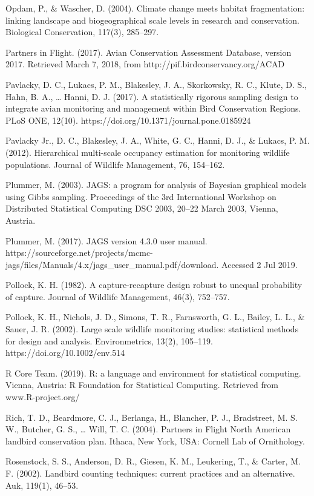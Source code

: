 \documentclass[
  letterpaper,
  DIV=11,
  numbers=noendperiod,
  oneside]{scrreprt}
\begin{document}
Opdam, P., \& Wascher, D. (2004). Climate change meets habitat
fragmentation: linking landscape and biogeographical scale levels in
research and conservation. Biological Conservation, 117(3), 285--297.

Partners in Flight. (2017). Avian Conservation Assessment Database,
version 2017. Retrieved March 7, 2018, from
http://pif.birdconservancy.org/ACAD

Pavlacky, D. C., Lukacs, P. M., Blakesley, J. A., Skorkowsky, R. C.,
Klute, D. S., Hahn, B. A., \ldots{} Hanni, D. J. (2017). A statistically
rigorous sampling design to integrate avian monitoring and management
within Bird Conservation Regions. PLoS ONE, 12(10).
https://doi.org/10.1371/journal.pone.0185924

Pavlacky Jr., D. C., Blakesley, J. A., White, G. C., Hanni, D. J., \&
Lukacs, P. M. (2012). Hierarchical multi-scale occupancy estimation for
monitoring wildlife populations. Journal of Wildlife Management, 76,
154--162.

Plummer, M. (2003). JAGS: a program for analysis of Bayesian graphical
models using Gibbs sampling. Proceedings of the 3rd International
Workshop on Distributed Statistical Computing DSC 2003, 20--22 March
2003, Vienna, Austria.

Plummer, M. (2017). JAGS version 4.3.0 user manual.
https://sourceforge.net/projects/mcmc-jags/files/Manuals/4.x/jags\_user\_manual.pdf/download.
Accessed 2 Jul 2019.

Pollock, K. H. (1982). A capture-recapture design robust to unequal
probability of capture. Journal of Wildlife Management, 46(3), 752--757.

Pollock, K. H., Nichols, J. D., Simons, T. R., Farnsworth, G. L.,
Bailey, L. L., \& Sauer, J. R. (2002). Large scale wildlife monitoring
studies: statistical methods for design and analysis. Environmetrics,
13(2), 105--119. https://doi.org/10.1002/env.514

R Core Team. (2019). R: a language and environment for statistical
computing. Vienna, Austria: R Foundation for Statistical Computing.
Retrieved from www.R-project.org/

Rich, T. D., Beardmore, C. J., Berlanga, H., Blancher, P. J.,
Bradstreet, M. S. W., Butcher, G. S., \ldots{} Will, T. C. (2004).
Partners in Flight North American landbird conservation plan. Ithaca,
New York, USA: Cornell Lab of Ornithology.

Rosenstock, S. S., Anderson, D. R., Giesen, K. M., Leukering, T., \&
Carter, M. F. (2002). Landbird counting techniques: current practices
and an alternative. Auk, 119(1), 46--53.
\end{document}
